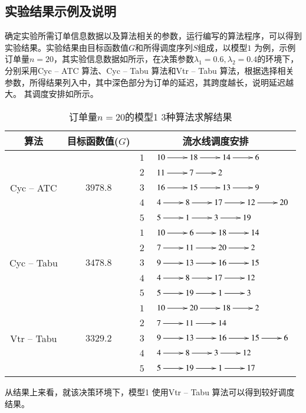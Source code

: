 \subsection{实验结果示例及说明}
确定实验所需订单信息数据以及算法相关的参数，运行编写的算法程序，可以得到实验结果。实验结果由目标函数值$G$和所得调度序列$S$组成，以模型$1$ 为例，示例订单量$n = 20$，其实验信息数据如所示，在决策参数$\lambda_1 = 0.6, \lambda_2 = 0.4$的环境下，分别采用Cyc -- ATC 算法、Cyc -- Tabu 算法和Vtr -- Tabu 算法，根据选择相关参数，所得结果列入中，其中深色部分为订单的延迟，其跨度越长，说明延迟越大。
其调度安排如所示。
\begin{table}[h!]
  \centering
  \label{tab:resultmodel1}\caption{订单量$n = 20$的模型1 $3$种算法求解结果}
    \begin{tabular}{cccl}
    \toprule
    算法    & 目标函数值($G$) & \multicolumn{2}{c}{流水线调度安排} \\
    \midrule
    \multirow{5}[2]{*}{Cyc -- ATC} & \multirow{5}[2]{*}{$3978.8$} & $1$     &$\xymatrix{10 \ar[r] & 18 \ar[r] & 14 \ar[r] & 6}$\\
          &       & $2$     &  $\xymatrix{11 \ar[r] & 7 \ar[r] & 2}$\\
          &       & $3$     &  $\xymatrix{16 \ar[r] & 15 \ar[r] & 13 \ar[r] & 9}$\\
          &       & $4$     &  $\xymatrix{4 \ar[r] & 8 \ar[r] & 17 \ar[r] & 12 \ar[r]&20}$\\
          &       & $5$     &  $\xymatrix{5 \ar[r] & 1 \ar[r] & 3 \ar[r] & 19}$\\
     \hline
    \multirow{5}[2]{*}{Cyc -- Tabu} & \multirow{5}[2]{*}{$3478.8$} & $1$     &  $\xymatrix{10 \ar[r] & 6 \ar[r] & 18 \ar[r] & 14}$\\
          &       & $2$     & $\xymatrix{7 \ar[r] & 11 \ar[r] & 20 \ar[r] & 2}$ \\
          &       & $3$     &  $\xymatrix{9 \ar[r] & 13 \ar[r] & 16 \ar[r] & 15}$\\
          &       & $4$     &  $\xymatrix{4 \ar[r] & 8 \ar[r] & 17 \ar[r] & 12}$\\
          &       & $5$     &  $\xymatrix{5 \ar[r] & 19 \ar[r] & 1 \ar[r] & 3}$\\
       \hline
    \multirow{5}[2]{*}{Vtr -- Tabu} & \multirow{5}[2]{*}{$3329.2$} & $1$     &  $\xymatrix{10 \ar[r] & 20 \ar[r] & 18 \ar[r] & 2}$\\
          &       & $2$     & $\xymatrix{7 \ar[r] & 11 \ar[r] & 14 }$ \\
          &       & $3$     &  $\xymatrix{9 \ar[r] & 13 \ar[r] & 16 \ar[r] & 15\ar[r]&6}$\\
          &       & $4$     &  $\xymatrix{4\ar[r] & 8 \ar[r] & 3 \ar[r] & 12}$\\
          &       & $5$     &  $\xymatrix{5 \ar[r] & 19 \ar[r] & 1 \ar[r] & 17}$\\
    \bottomrule
    \end{tabular}
  \label{tab:resultexample20}
\end{table}

从结果上来看，就该决策环境下，模型1 使用Vtr -- Tabu 算法可以得到较好调度结果。
